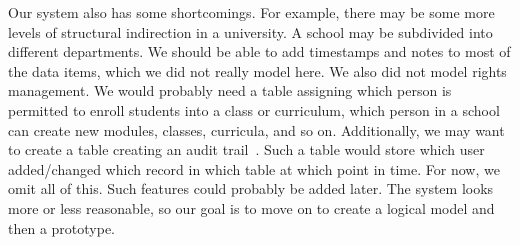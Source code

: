 Our system also has some shortcomings.
For example, there may be some more levels of structural indirection in a university.
A school may be subdivided into different departments.
We should be able to add timestamps and notes to most of the data items, which we did not really model here.
We also did not model rights management.
We would probably need a table assigning which person is permitted to enroll students into a class or curriculum, which person in a school can create new modules, classes, curricula, and so on.
Additionally, we may want to create a table creating an audit trail~\cite{K2010ATTDCID}.
Such a table would store which user added/changed which record in which table at which point in time.
For now, we omit all of this.
Such features could probably be added later.
The system looks more or less reasonable, so our goal is to move on to create a logical model and then a prototype.%
%
\FloatBarrier%
\endhsection%
%
